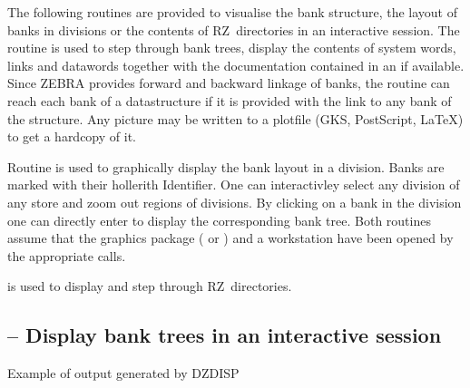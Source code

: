 The following routines are provided to visualise the bank structure,
the layout of banks in divisions or the contents of RZ~directories 
in an interactive session. 
The routine 
is used to step through bank trees, display the contents of system
words, links and datawords together with the documentation contained
in an \RZfile{} if available.
Since ZEBRA provides forward and backward linkage of banks,
the routine can reach each bank of a datastructure if it is provided
with the link to any bank of the structure. 
Any picture may be written to a plotfile 
(GKS, PostScript, LaTeX) to get a hardcopy of it.
 
Routine  is used to graphically display the bank layout
in a division. 
Banks are marked with their hollerith Identifier.
One can interactivley select any division of any store and
zoom out regions of divisions. 
By clicking on a bank in the division
one can directly enter  to display the corresponding bank tree.
Both routines assume that the graphics package (\cite{bib-GKS1} or
\cite{bib-HIGZ}) and a workstation
have been opened by the appropriate calls.
 
 is used to display and step through RZ~directories.
\subsection[{\tt DZDISP} -- Display bank trees in an interactive session]%
           { -- Display bank trees in an interactive session}
\begin{Fighere}
\begin{center}
\caption{Example of output generated by DZDISP}
\label{fig:DZDOCFIG2}
\end{center}
\end{Fighere}
 
 
